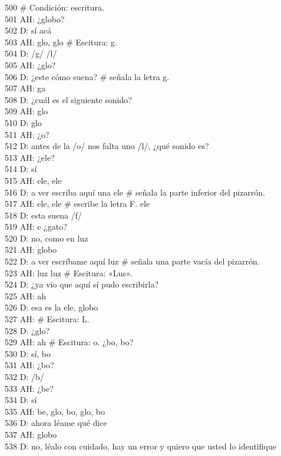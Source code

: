 500 \# Condición: escritura.\\
501 AH: ¿globo?\\
502 D: sí acá\\
503 AH: glo, glo \# Escitura: g.\\
504 D: /g/ /l/\\
505 AH: ¿glo?\\
506 D: ¿este cómo suena? \# señala la letra g.\\
507 AH: ga\\
508 D: ¿cuál es el siguiente sonido?\\
509 AH: glo\\
510 D: glo\\
511 AH: ¿o?\\
512 D: antes de la /o/ nos falta uno /l/, ¿qué sonido es?\\
513 AH: ¿ele?\\
514 D: sí\\
515 AH: ele, ele\\
516 D: a ver escriba aquí una ele \# señala la parte inferior del pizarrón.\\
517 AH: ele, ele \# escribe la letra F. ele\\
518 D: esta suena /f/\\
519 AH: e ¿gato?\\
520 D: no, como en luz\\
521 AH: globo\\
522 D: a ver escríbame aquí luz \# señala una parte vacía del pizarrón.\\
523 AH: luz luz \# Escitura: «Lus».\\
524 D: ¿ya vio que aquí sí pudo escribirla?\\
525 AH: ah\\
526 D: esa es la ele, globo\\
527 AH: \# Escitura: L.\\
528 D: ¿glo?\\
529 AH: ah \# Escitura: o. ¿bo, bo?\\
530 D: sí, bo\\
531 AH: ¿bo?\\
532 D: /b/\\
533 AH: ¿be?\\
534 D: sí\\
535 AH: be, glo, bo, glo, bo\\
536 D: ahora léame qué dice\\
537 AH: globo\\
538 D: no, léalo con cuidado, hay un error y quiero que usted lo identifique\\
